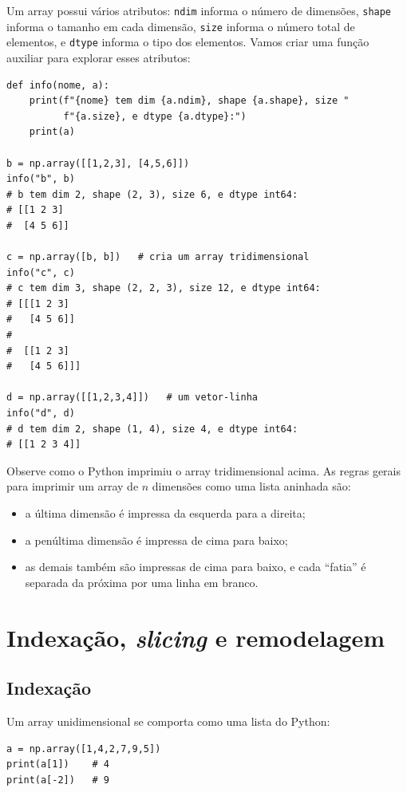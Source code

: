 \documentclass[11pt,a4paper]{article}
\begin{document}
Um array possui vários atributos: \texttt{ndim} informa o número de
dimensões, \texttt{shape} informa o tamanho em cada dimensão,
\texttt{size} informa o número total de elementos, e \texttt{dtype}
informa o tipo dos elementos. Vamos criar uma função auxiliar para
explorar esses atributos:

\begin{lstlisting}
def info(nome, a):
    print(f"{nome} tem dim {a.ndim}, shape {a.shape}, size "
          f"{a.size}, e dtype {a.dtype}:")
    print(a)

b = np.array([[1,2,3], [4,5,6]])
info("b", b)
# b tem dim 2, shape (2, 3), size 6, e dtype int64:
# [[1 2 3]
#  [4 5 6]]

c = np.array([b, b])   # cria um array tridimensional
info("c", c)
# c tem dim 3, shape (2, 2, 3), size 12, e dtype int64:
# [[[1 2 3]
#   [4 5 6]]
#
#  [[1 2 3]
#   [4 5 6]]]

d = np.array([[1,2,3,4]])   # um vetor-linha
info("d", d)
# d tem dim 2, shape (1, 4), size 4, e dtype int64:
# [[1 2 3 4]]
\end{lstlisting}

Observe como o Python imprimiu o array tridimensional acima. As regras
gerais para imprimir um array de $n$ dimensões como uma lista aninhada
são:

\begin{itemize}
\item a última dimensão é impressa da esquerda para a direita;
\item a penúltima dimensão é impressa de cima para baixo;
\item as demais também são impressas de cima para baixo, e cada
  ``fatia'' é separada da próxima por uma linha em branco.
\end{itemize}

\section{Indexação, \emph{slicing} e remodelagem}

\subsection{Indexação}

Um array unidimensional se comporta como uma lista do Python:

\begin{lstlisting}
a = np.array([1,4,2,7,9,5])
print(a[1])    # 4
print(a[-2])   # 9
\end{lstlisting}
\end{document}
